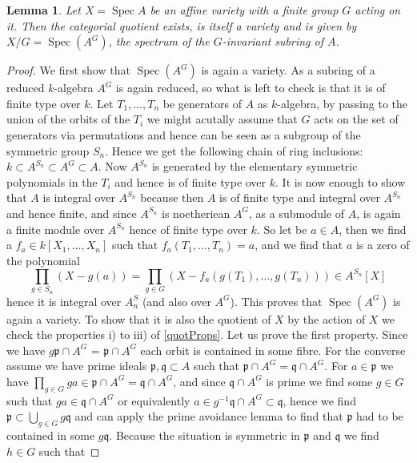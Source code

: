 \documentclass[11pt, a4paper, german]{article}
\theoremstyle{plain}
\newtheorem{lemma}[theorem]{Lemma}
\theoremstyle{definition}
\DeclareMathOperator{\Spec}{Spec}
\begin{document}
\begin{lemma}
    Let $X = \Spec{A}$ be an affine variety with a finite group $G$ acting on it. Then the categorial quotient exists, is itself a variety and
    is given by $X/G = \Spec(A^G)$, the spectrum of the $G$-invariant subring of $A$.
\end{lemma}
\begin{proof}
    We first show that $\Spec(A^G)$ is again a variety. As a subring of a reduced $k$-algebra $A^G$ is again reduced, so what is left to check
    is that it is of finite type over $k$. Let $T_1,\dots,T_n$ be generators of $A$ as $k$-algebra, by passing to the union of the orbits of
    the $T_i$ we might acutally assume that $G$ acts on the set of generators via permutations and hence can be seen as a subgroup of the 
    symmetric group $S_n$. Hence we get the following chain of ring inclusions: $k \subset A^{S_n} \subset A^G \subset A$. Now $A^{S_n}$ is
    generated by the elementary symmetric polynomials in the $T_i$ and hence is of finite type over $k$.
    It is now enough to show that $A$ is integral over $A^{S_n}$ because then $A$ is of finite type and integral over $A^{S_n}$ and hence
    finite, and since $A^{S_n}$ is noetheriean $A^G$, as a submodule of $A$, 
    is again a finite module over $A^{S_n}$ hence of finite type over $k$.
    So let be $a \in A$, then we find a $f_a \in k[X_1,\dots,X_n]$ such that $f_a(T_1,\dots,T_n) = a$, and we find that $a$ is a zero of
    the polynomial
    \[
        \prod_{g \in S_n} (X - g(a)) = \prod_{g \in G} (X - f_a(g(T_1),\dots,g(T_n))) \in A^{S_n}[X]
    \]
    hence it is integral over $A^S_n$ (and also over $A^G$).
    This proves that $\Spec(A^G)$ is again a variety. To show that it is also the quotient of $X$ by the action of $X$ we check the properties
    i) to iii) of \ref{quotProps}. Let us prove the first property.
    Since we have $g\mathfrak{p} \cap A^G$ = $\mathfrak{p} \cap A^G$ each orbit is contained in some fibre. For the converse assume we have
    prime ideals $\mathfrak{p},\mathfrak{q} \subset A$ such that $\mathfrak{p} \cap A^G = \mathfrak{q} \cap A^G$.
    For $a \in \mathfrak{p}$ we have $\prod_{g \in G} ga \in \mathfrak{p} \cap A^G = \mathfrak{q} \cap A^G$, and since $\mathfrak{q} \cap A^G$
    is prime we find some $g \in G$ such that $ga \in \mathfrak{q} \cap A^G$ or equivalently 
    $a \in g^{-1}\mathfrak{q} \cap A^G \subset \mathfrak{q}$, hence 
    we find $\mathfrak{p} \subset \bigcup_{g \in G} g\mathfrak{q}$ and can apply the prime avoidance lemma to find that $\mathfrak{p}$ had to be
    contained in some $g\mathfrak{q}$. Because the situation is symmetric in $\mathfrak{p}$ and $\mathfrak{q}$ we find $h \in G$ such that

\end{proof}
\end{document}
